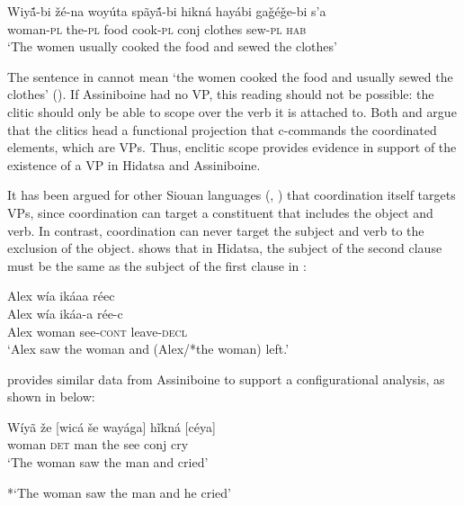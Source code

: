 \documentclass[output=paper]{LSP/langsci}
\begin{document}
\begin{exe}
\ex\label{ex:jrs:28} \gll Wiy\'{\~a}-bi 		\v{z}\'e-na 	woy\'uta 	sp\~ay\'{\~a}-bi 	hikn\'a 	hay\'abi 		ga\v{g}\'e\v{g}e-bi 	s'a \\
woman-\textsc{pl} the-\textsc{pl} 	food 	cook-\textsc{pl} 	conj 	clothes 	sew-\textsc{pl} 	\textsc{hab} \\
\trans `The women usually cooked the food and sewed the clothes' \citep[39]{West2003}
\end{exe}

The sentence in  cannot mean `the women cooked the food and usually sewed the clothes' (\citealt{West2003}).  If Assiniboine had no VP, this reading should not be possible: the clitic should only be able to scope over the verb it is attached to. Both \citet{Boyle2007} and \citet{West2003} argue that the clitics head a functional projection that c-commands the coordinated elements, which are VPs.  Thus, enclitic scope provides evidence in support of the existence of a VP in Hidatsa and Assiniboine.
	
It has been argued for other Siouan languages (\citealt{Boyle2007}, \citealt{West2003}) that coordination itself targets VPs, since coordination can target a constituent that includes the object and verb. In contrast, coordination can never target the subject and verb to the exclusion of the object.  \citet{Boyle2007} shows that in Hidatsa, the subject of the second clause must be the same as the subject of the first clause in :

\begin{exe}
\ex\label{ex:jrs:29} 
\glll Alex w\'ia ik\'aaa r\'eec\\
Alex w\'ia ik\'aa-a r\'ee-c \\
Alex woman see-\textsc{cont} leave-\textsc{decl} \\
\trans `Alex saw the woman and (Alex/*the woman) left.' \citep[217]{Boyle2007} 
\end{exe}

\citet{West2003} provides similar data from Assiniboine to support a configurational analysis, as shown in  below:

\begin{exe}
\ex\label{ex:jrs:30} \gll W\'iy\~a 	 \v{z}e 		[wic\'a 	\v{s}e 	way\'aga] h\~ikn\'a 	[c\'eya] \\
woman 	\textsc{det} 	man 		the see 				conj 		cry \\
\trans `The woman saw the man and cried'

*`The woman saw the man and he cried' \citep[34]{West2003}
\end{exe}
\end{document}
